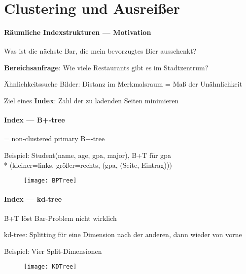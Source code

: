 \section{Clustering und Ausreißer}
\label{sec:clustering}

\paragraph{Räumliche Indexstrukturen --- Motivation}
\begin{items}
	\item Was ist die nächste Bar, die mein bevorzugtes Bier ausschenkt?
	\item \textbf{Bereichsanfrage}: Wie viele Restaurants gibt es im Stadtzentrum?
	\item Ähnlichkeitssuche Bilder: Distanz im Merkmalsraum = Maß der Unähnlichkeit
	\item Ziel eines \textbf{Index}: Zahl der zu ladenden Seiten minimieren
\end{items}

\paragraph{Index --- B+-tree}
\begin{items}
	\item = non-clustered primary B+-tree
	\item Beispiel: Student(name, age, gpa, major), B+T für gpa \\* (kleiner=links, größer=rechts, (gpa, (Seite, Eintrag)))
	\begin{figure}[H]\centering\label{BPTree}\texttt{[image: BPTree]}\end{figure}
\end{items}



\paragraph{Index --- kd-tree}
\begin{items}
	\item B+T löst Bar-Problem nicht wirklich
	\item kd-tree: Splitting für eine Dimension nach der anderen, dann wieder von vorne
	\item Beispiel: Vier Split-Dimensionen
\end{items}
\begin{figure}[H]\centering\label{KDTree}\texttt{[image: KDTree]}\end{figure}

